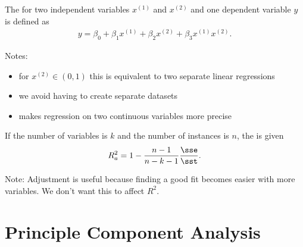 \documentclass{article}
\begin{document}
\begin{definition}
	The  for two independent variables $x^{(1)}$ and $x^{(2)}$ and one dependent variable $y$
	is defined as
	\begin{align*}
		y = \beta_0 + \beta_1 x^{(1)} + \beta_2 x^{(2)} + \beta_3 x^{(1)}x^{(2)}.
	\end{align*}
\end{definition}
Notes:
\begin{itemize}
	\item for $x^{(2)}\in (0,1)$ this is equivalent to two separate linear regressions
	\item we avoid having to create separate datasets
	\item makes regression on two continuous variables more precise
\end{itemize}
\begin{definition}
	If the number of variables is $k$ and the number of instances is $n$, the
	 is given
	\begin{align*}
		R^2_a = 1 - \frac{n-1}{n-k-1}\frac{\sse}{\sst}.
	\end{align*}
\end{definition}
Note: Adjustment is useful because finding a good fit becomes easier with more variables. We don't want this to affect $R^2$.



\section{Principle Component Analysis}
\end{document}
